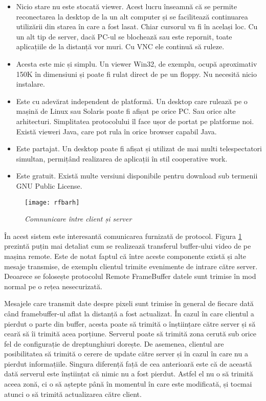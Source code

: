 \begin{itemize}
  \item Nicio stare nu este stocată viewer. Acest lucru înseamnă că se permite reconectarea  la desktop de la un alt computer și se facilitează continuarea utilizării din starea în care a fost lasat. Chiar cursorul va fi în același loc. Cu un alt tip de server, dacă PC-ul se blochează sau este repornit, toate aplicațiile de la distanță vor muri. Cu VNC ele continuă să ruleze.
  \item Acesta este mic și simplu. Un viewer Win32, de exemplu, ocupă aproximativ 150K în dimensiuni și poate fi rulat direct de pe un floppy. Nu necesită nicio instalare.
  \item Este cu adevărat independent de platformă. Un desktop care rulează pe o mașină de Linux sau Solaris poate fi afișat pe orice PC. Sau orice alte arhitecturi. Simplitatea protocolului îl face ușor de portat pe platforme noi. Există vieweri Java, care pot rula în orice browser capabil Java.
  \item Este partajat. Un desktop poate fi afișat și utilizat de mai multi telespectatori simultan, permițând realizarea de aplicații în stil cooperative work.
  \item Este gratuit. Există multe versiuni disponibile pentru download sub termenii GNU Public License.
\end{itemize}

\begin{figure}
    \centering
    \texttt{[image: rfbarh]}
    \caption{\textit{Comnunicare între client și server}}
    \label{vncarhi}
\end{figure}

În acest sistem este interesantă comunicarea furnizată de protocol. Figura \ref{vncarhi} prezintă puțin mai detaliat cum se realizează transferul buffer-ului video de pe mașina remote. Este de notat faptul că între aceste componente există și alte mesaje transmise, de exemplu clientul trimite evenimente de intrare către server. Deoarece se folosește protocolul Remote FrameBuffer datele sunt trimise în mod normal pe o rețea nesecurizată. 

Mesajele care transmit date despre pixeli sunt trimise în general de fiecare dată când framebuffer-ul aflat la distanță a fost actualizat. În cazul în care clientul a pierdut o parte din buffer, acesta poate să trimită o înștiințare către server și să ceară să îi trimită acea porțiune. Serverul poate să trimită zona cerută sub orice fel de configurație de dreptunghiuri dorește. De asemenea, clientul are posibilitatea să trimită o cerere de update către server și în cazul în care nu a pierdut informațiile. Singura diferență față de cea anterioară este că de această dată serverul este înștiințat că nimic nu a fost pierdut. Astfel el nu o să trimită aceea zonă, ci o să aștepte până în momentul în care este modificată, și tocmai atunci o să trimită actualizarea către client.

